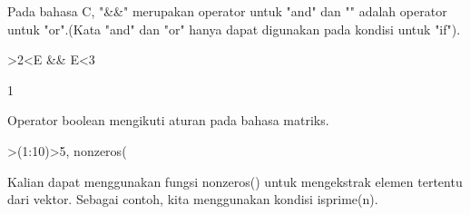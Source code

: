 \documentclass{article}
\begin{document}
\begin{eulernotebook}
\begin{eulercomment}
Pada bahasa C, "\&\&" merupakan operator untuk "and" dan "\textbar{}\textbar{}" adalah
operator untuk "or".(Kata "and" dan "or" hanya dapat digunakan pada
kondisi untuk "if").
\end{eulercomment}
\begin{eulerprompt}
>2<E && E<3
\end{eulerprompt}
\begin{euleroutput}
  1
\end{euleroutput}
\begin{eulercomment}
Operator boolean mengikuti aturan pada bahasa matriks.
\end{eulercomment}
\begin{eulerprompt}
>(1:10)>5, nonzeros(%
\end{eulerprompt}
\begin{euleroutput}
  [0,  0,  0,  0,  0,  1,  1,  1,  1,  1]
  [6,  7,  8,  9,  10]
\end{euleroutput}
\begin{eulercomment}
Kalian dapat menggunakan fungsi nonzeros() untuk mengekstrak elemen
tertentu dari vektor. Sebagai contoh, kita menggunakan kondisi
isprime(n).


\end{eulercomment}
\end{eulernotebook}
\end{document}
